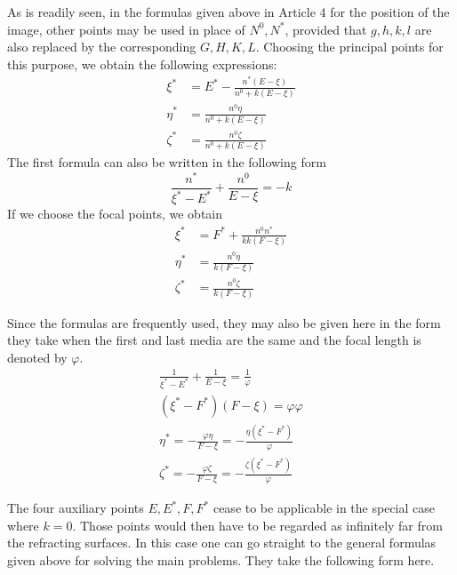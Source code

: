 As is readily seen, in the formulas given above in Article 4 for the position of the image, other points may be used in place of $N^0,N^*$, provided that $g,h,k,l$ are also replaced by the corresponding $G,H,K,L$. Choosing the principal points for this purpose, we obtain the following expressions:
\[
\begin{aligned}
\xi^*&=E^*-\frac{n^*(E-\xi)}{n^0+k(E-\xi)}\\
\eta^*&=\frac{n^0\eta}{n^0+k(E-\xi)}\\
\zeta^*&=\frac{n^0\zeta}{n^0+k(E-\xi)}
\end{aligned}
\]
The first formula can also be written in the following form
\[
\frac{n^*}{\xi^*-E^*}+\frac{n^0}{E-\xi}=-k
\]
If we choose the focal points, we obtain
\[
\begin{aligned}
\xi^*&=F^*+\frac{n^0n^*}{kk(F-\xi)}\\
\eta^*&=\frac{n^0\eta}{k(F-\xi)}\\
\zeta^*&=\frac{n^0\zeta}{k(F-\xi)}
\end{aligned}
\]

Since the formulas are frequently used, they may also be given here in the form they take when the first and last media are the same and the focal length is denoted by $\varphi$.
\[
\begin{gathered}
\frac1{\xi^*-E^*}+\frac1{E-\xi}=\frac1\varphi\\
(\xi^*-F^*)(F-\xi)=\varphi\varphi\\
\eta^*=-\frac{\varphi\eta}{F-\xi}=-\frac{\eta(\xi^*-F^*)}{\varphi}\\
\zeta^*=-\frac{\varphi\zeta}{F-\xi}=-\frac{\zeta(\xi^*-F^*)}{\varphi}
\end{gathered}
\]

The four auxiliary points $E,E^*,F,F^*$ cease to be applicable in the special case where $k=0$. Those points would then have to be regarded as infinitely far from the refracting surfaces. In this case one can go straight to the general formulas given above for solving the main problems. They take the following form here.

